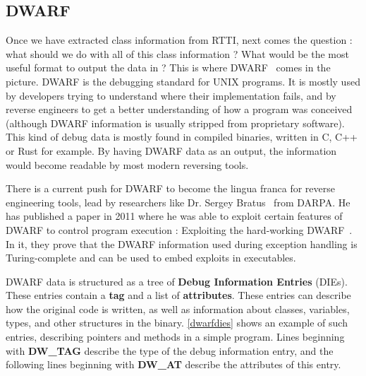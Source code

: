 \documentclass[a4paper,11pt,oneside]{report}
\begin{document}
\subsection{DWARF}
\label{dwarfdesign}

Once we have extracted class information from RTTI, next comes the question :
what should we do with all of this class information ? What would be the most
useful format to output the data in ?
This is where DWARF~\cite{dwarf} comes in the picture. DWARF is the debugging 
standard for UNIX programs.
It is mostly used by developers trying to understand where their implementation 
fails,
and by reverse engineers to get a better understanding of how a program was 
conceived (although DWARF information is usually stripped from proprietary 
software).
This kind of debug data is mostly found in compiled binaries, written in C,
C++ or Rust for example. 
By having DWARF data as an output, the information would become readable by 
most modern reversing tools.

There is a current push for DWARF to become the lingua franca for reverse 
engineering tools, lead by researchers like Dr. Sergey Bratus~\cite{bratus} 
from DARPA.
He has published a paper in 2011 where he was able to exploit certain features 
of DWARF to control program execution : Exploiting the hard-working 
DWARF~\cite{hardworkingdwarf}.
In it, they prove that the DWARF information used during exception handling
is Turing-complete and can be used to embed exploits in executables.

DWARF data is structured as a tree of \textbf{Debug Information Entries} 
(DIEs). These entries contain a \textbf{tag} and a list of
\textbf{attributes}.
These entries can describe how the original code is written, as well as
information about classes, variables, types, and other structures in the
binary. \autoref{dwarfdies} shows an example of such entries, describing
pointers and methods in a simple program. Lines beginning with \textbf{DW\_TAG}
describe the type of the debug information entry, and the following lines
beginning with \textbf{DW\_AT} describe the attributes of this entry.
\end{document}
